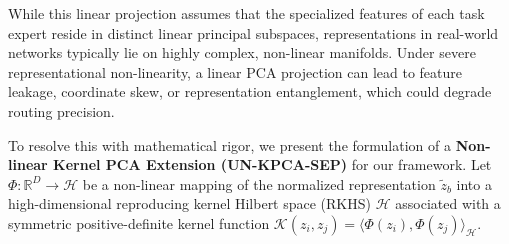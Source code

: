 While this linear projection assumes that the specialized features of each task expert reside in distinct linear principal subspaces, representations in real-world networks typically lie on highly complex, non-linear manifolds. Under severe representational non-linearity, a linear PCA projection can lead to feature leakage, coordinate skew, or representation entanglement, which could degrade routing precision. 

To resolve this with mathematical rigor, we present the formulation of a \textbf{Non-linear Kernel PCA Extension (UN-KPCA-SEP)} for our framework. Let $\Phi: \mathbb{R}^D \to \mathcal{H}$ be a non-linear mapping of the normalized representation $\tilde{z}_b$ into a high-dimensional reproducing kernel Hilbert space (RKHS) $\mathcal{H}$ associated with a symmetric positive-definite kernel function $\mathcal{K}(z_i, z_j) = \langle \Phi(z_i), \Phi(z_j) \rangle_\mathcal{H}$.

